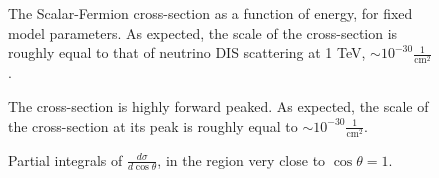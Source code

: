 \documentclass[11pt, oneside]{article}   	%
\begin{document}
\begin{figure}[h!]
    \caption{The Scalar-Fermion cross-section as a function of energy, for fixed model parameters. As expected, the scale of the cross-section is roughly equal to that of neutrino DIS scattering at 1 TeV, $\sim 10^{-30} \frac{1}{\text{cm}^2}$.}
\end{figure}

\begin{figure}[h!]
    \caption{The cross-section is highly forward peaked. As expected, the scale of the cross-section at its peak is roughly equal to  $\sim 10^{-30} \frac{1}{\text{cm}^2}$.}
\end{figure}

\begin{figure}[h!]
    \caption{Partial integrals of $\frac{d\sigma}{d\cos\theta}$, in the region very close to $\cos\theta = 1$.}
\end{figure}
\end{document}
